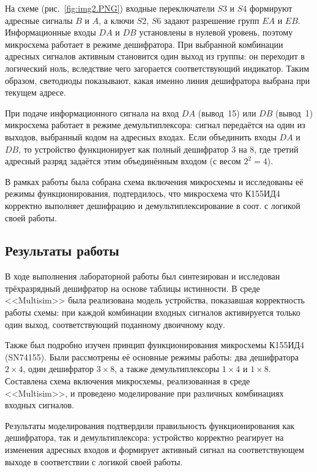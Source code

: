 На схеме (рис.~\ref{fig:img2.PNG}) входные переключатели $S3$ и $S4$ формируют адресные сигналы $B$ и $A$, а ключи $S2$, $S6$ задают разрешение групп $EA$ и $EB$.
Информационные входы $DA$ и $DB$ установлены в нулевой уровень, поэтому микросхема работает в режиме дешифратора.
При выбранной комбинации адресных сигналов активным становится один выход из группы: он переходит в логический ноль, вследствие чего загорается соответствующий индикатор.
Таким образом, светодиоды показывают, какая именно линия дешифратора выбрана при текущем адресе.

При подаче информационного сигнала на вход $DA$ (вывод~15) или $DB$
(вывод~1) микросхема работает в режиме демультиплексора: сигнал передаётся
на один из выходов, выбранный кодом на адресных входах. Если объединить
входы $DA$ и $DB$, то устройство функционирует как полный дешифратор 3 на 8,
где третий адресный разряд задаётся этим объединённым входом (с весом $2^2=4$).

В рамках работы была собрана схема включения микросхемы и исследованы
её режимы функционирования, подтердилось, что микросхема что К155ИД4 корректно выполняет дешифрацию и демультиплексирование в соот. с логикой своей работы.

\subsection*{Результаты работы}

В ходе выполнения лабораторной работы был синтезирован и исследован трёхразрядный дешифратор на основе таблицы истинности.
В среде <<Multisim>> была реализована модель устройства, показавшая корректность работы схемы: при каждой комбинации входных сигналов активируется только один выход, соответствующий поданному двоичному коду.

Также был подробно изучен принцип функционирования микросхемы К155ИД4 (SN74155).
Были рассмотрены её основные режимы работы: два дешифратора $2 \times 4$, один дешифратор $3 \times 8$, а также демультиплексоры $1 \times 4$ и $1 \times 8$.
Составлена схема включения микросхемы, реализованная в среде <<Multisim>>, и проведено моделирование при различных комбинациях входных сигналов.

Результаты моделирования подтвердили правильность функционирования как дешифратора, так и демультиплексора: устройство корректно реагирует на изменения адресных входов и формирует активный сигнал на соответствующем выходе в соответствии с логикой своей работы.
